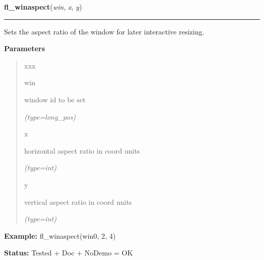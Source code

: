 \hspace{.8\funcindent}\begin{boxedminipage}{\funcwidth}

    \raggedright \textbf{fl\_winaspect}(\textit{win}, \textit{x}, \textit{y})

    \vspace{-1.5ex}

    \rule{\textwidth}{0.5\fboxrule}
\setlength{\parskip}{2ex}
    Sets the aspect ratio of the window for later interactive resizing.

\setlength{\parskip}{1ex}
      \textbf{Parameters}
      \vspace{-1ex}

      \begin{quote}
        \begin{Ventry}{xxx}

          \item[win]

          window id to be set

            {\it (type=long\_pos)}

          \item[x]

          horizontal aspect ratio in coord units

            {\it (type=int)}

          \item[y]

          vertical aspect ratio in coord units

            {\it (type=int)}

        \end{Ventry}

      \end{quote}

\textbf{Example:} fl\_winaspect(win0, 2, 4)



\textbf{Status:} Tested + Doc + NoDemo = OK



    \end{boxedminipage}

    \label{xformslib:flxbasic:fl_reset_winconstraints}

    \vspace{0.5ex}

